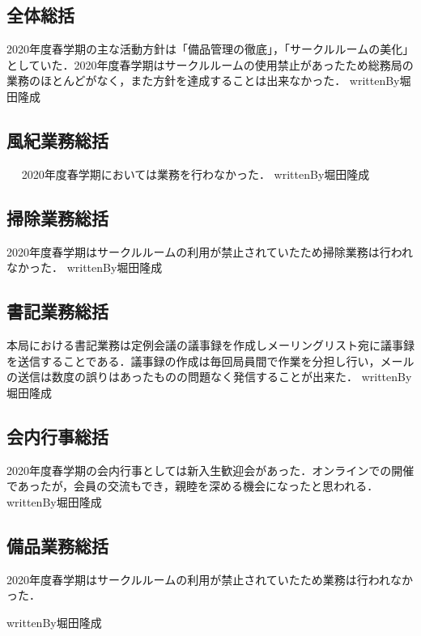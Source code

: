 \subsection*{全体総括}
2020年度春学期の主な活動方針は「備品管理の徹底」，「サークルルームの美化」としていた．2020年度春学期はサークルルームの使用禁止があったため総務局の業務のほとんどがなく，また方針を達成することは出来なかった．
writtenBy{\soumuChief}{堀田}{隆成}

\subsection*{風紀業務総括}　
2020年度春学期においては業務を行わなかった．
writtenBy{\soumuChief}{堀田}{隆成}

\subsection*{掃除業務総括}
2020年度春学期はサークルルームの利用が禁止されていたため掃除業務は行われなかった．
writtenBy{\soumuChief}{堀田}{隆成}

\subsection*{書記業務総括}
本局における書記業務は定例会議の議事録を作成しメーリングリスト宛に議事録を送信することである．議事録の作成は毎回局員間で作業を分担し行い，メールの送信は数度の誤りはあったものの問題なく発信することが出来た．
writtenBy{\soumuChief}{堀田}{隆成}

\subsection*{会内行事総括}
2020年度春学期の会内行事としては新入生歓迎会があった．オンラインでの開催であったが，会員の交流もでき，親睦を深める機会になったと思われる．
writtenBy{\soumuChief}{堀田}{隆成}

\subsection*{備品業務総括}
2020年度春学期はサークルルームの利用が禁止されていたため業務は行われなかった．

writtenBy{\soumuChief}{堀田}{隆成}
